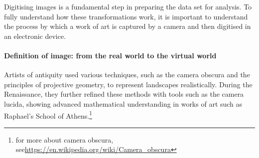 Digitising images is a fundamental step in preparing the data set for analysis. To fully understand how these transformations work, it is important to understand the process by which a work of art is captured by a camera and then digitised in an electronic device.

\paragraph{Definition of image: from the real world to the virtual world}
Artists of antiquity used various techniques, such as the camera obscura and the principles of projective geometry, to represent landscapes realistically. During the Renaissance, they further refined these methods with tools such as the camera lucida, showing advanced mathematical understanding in works of art such as Raphael's School of Athens.\footnote{for more about camera obscura, see\newline\url{https://en.wikipedia.org/wiki/Camera_obscura}}

